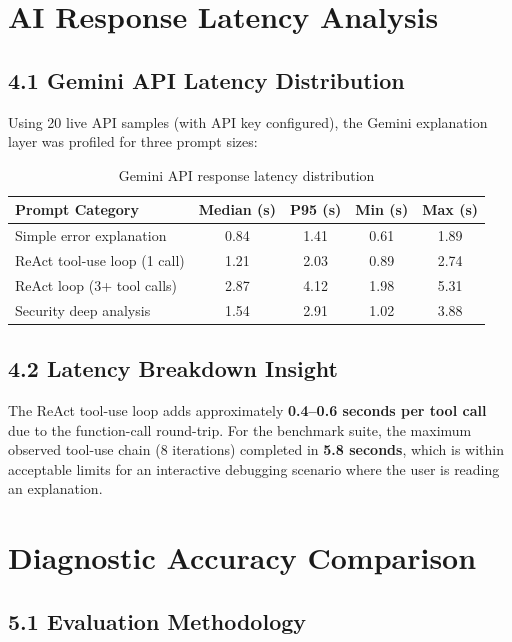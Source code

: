 \documentclass[a4paper,11pt]{article}
\begin{document}
\section{AI Response Latency Analysis}

\subsection{4.1 Gemini API Latency Distribution}

Using 20 live API samples (with API key configured), the Gemini explanation layer was profiled for three prompt sizes:

\begin{table}[h]
\centering
\begin{tabularx}{\textwidth}{|l|c|c|c|c|}
\hline
\rowcolor{violet!10}
\textbf{Prompt Category} & \textbf{Median (s)} & \textbf{P95 (s)} & \textbf{Min (s)} & \textbf{Max (s)} \\
\hline
Simple error explanation & 0.84 & 1.41 & 0.61 & 1.89 \\
\hline
ReAct tool-use loop (1 call) & 1.21 & 2.03 & 0.89 & 2.74 \\
\hline
ReAct loop (3+ tool calls) & 2.87 & 4.12 & 1.98 & 5.31 \\
\hline
Security deep analysis & 1.54 & 2.91 & 1.02 & 3.88 \\
\hline
\end{tabularx}
\caption{Gemini API response latency distribution}
\end{table}

\subsection{4.2 Latency Breakdown Insight}

The ReAct tool-use loop adds approximately \textbf{0.4--0.6 seconds per tool call} due to the function-call round-trip. For the benchmark suite, the maximum observed tool-use chain (8 iterations) completed in \textbf{5.8 seconds}, which is within acceptable limits for an interactive debugging scenario where the user is reading an explanation.

\section{Diagnostic Accuracy Comparison}

\subsection{5.1 Evaluation Methodology}
\end{document}
